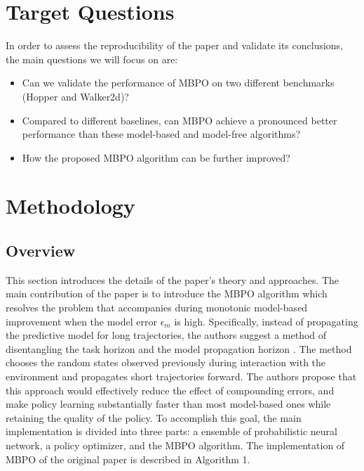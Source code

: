 \section{Target Questions}
In order to assess the reproducibility of the paper and validate its conclusions, the main questions we will focus on are:
\begin{itemize}
    \item Can we validate the performance of MBPO on two different benchmarks \cite{ref4} (Hopper and Walker2d)?
    \item Compared to different baselines, can MBPO achieve a pronounced better performance than these model-based and model-free algorithms?
    \item How the proposed MBPO algorithm can be further improved?
\end{itemize}

\section{Methodology}

\subsection{Overview}
This section introduces the details of the paper's theory and approaches. The main contribution of the paper is to introduce the MBPO algorithm which resolves the problem that accompanies during monotonic model-based improvement when the model error $\epsilon_m$ is high. Specifically, instead of propagating the predictive model for long trajectories, the authors suggest a method of disentangling the task horizon and the model propagation horizon \cite{ref5}. The method chooses the random states observed previously during interaction with the environment and propagates short trajectories forward. The authors propose that this approach would effectively reduce the effect of compounding errors, and make policy learning substantially faster than most model-based ones while retaining the quality of the policy. To accomplish this goal, the main implementation is divided into three parts: a ensemble of probabilistic neural network, a policy optimizer, and the MBPO algorithm. The implementation of MBPO of the original paper is described in Algorithm 1.

